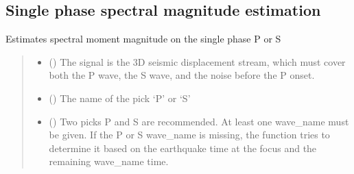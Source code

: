 \documentclass[letterpaper,10pt,english]{sphinxmanual}
\begin{document}

\subsection{Single phase spectral magnitude estimation}
\label{\detokenize{api_support:single-phase-spectral-magnitude-estimation}}\label{\detokenize{api_support:module-amw.mw.single_phase_mw}}

\begin{fulllineitems}
\label{\detokenize{api_support:amw.mw.single_phase_mw.estimate_single_phase_mw}}
\pysigstartsignatures
{}
\pysigstopsignatures
\sphinxAtStartPar
Estimates spectral moment magnitude on the single phase P or S
\begin{quote}\begin{description}
\begin{itemize}
\item {} 
\sphinxAtStartPar
{} () \textendash{} The signal is the 3D seismic displacement stream, which must cover both the P wave, the S wave,
and the noise before the P onset.

\item {} 
\sphinxAtStartPar
{} () \textendash{} The name of the pick ‘P’ or ‘S’

\item {} 
\sphinxAtStartPar
{} (\sphinxstyleliteralemphasis{\sphinxupquote{(}}\sphinxstyleliteralemphasis{\sphinxupquote{)}}) \textendash{} Two picks P and S are recommended. At least one wave\_name must be given.
If the P or S wave\_name is missing,
the function tries to determine it based on the earthquake time at the focus and the remaining wave\_name time.


\end{itemize}
\end{description}
\end{quote}
\end{fulllineitems}
\end{document}
